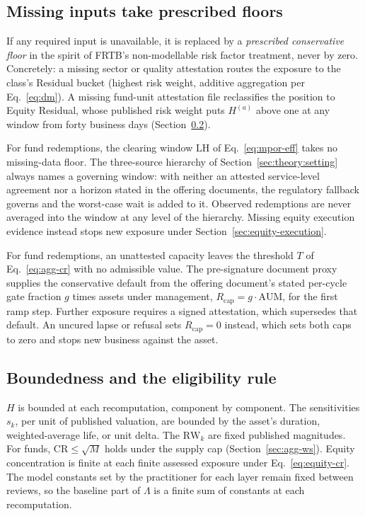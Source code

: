 \subsection{Missing inputs take prescribed floors}\label{sec:agg-missing}
If any required input is unavailable, it is replaced by a \emph{prescribed conservative
floor} in the spirit of FRTB's non-modellable risk factor treatment, never by zero.
Concretely: a missing sector or quality attestation routes the exposure to the
class's Residual bucket (highest risk weight, additive aggregation per
Eq.~\eqref{eq:dm}). A missing fund-unit attestation file reclassifies the position
to Equity Residual, whose published risk weight puts $H^{(a)}$ above one at any window from
forty business days (Section~\ref{sec:agg-bounded}).

For fund redemptions, the clearing window $\mathrm{LH}$ of Eq.~\eqref{eq:mpor-eff} takes no missing-data floor.
The three-source hierarchy of Section~\ref{sec:theory:setting} always names a governing
window: with neither an attested service-level agreement nor a horizon stated in the offering
documents, the regulatory fallback governs and the worst-case wait is added to it. Observed
redemptions are never averaged into the window at any level of the hierarchy. Missing equity execution evidence instead stops new exposure under Section~\ref{sec:equity-execution}.

For fund redemptions, an unattested capacity leaves the threshold $T$ of Eq.~\eqref{eq:agg-cr}
with no admissible value. The pre-signature document proxy supplies the conservative default from the offering
document's stated per-cycle gate fraction $g$ times assets under management,
$R_{\mathrm{cap}} = g\cdot\mathrm{AUM}$, for the first ramp step. Further exposure requires
a signed attestation, which supersedes that default. An uncured lapse or refusal sets
$R_{\mathrm{cap}}=0$ instead, which sets both caps to zero and stops new business against the
asset.

\subsection{Boundedness and the eligibility rule}\label{sec:agg-bounded}
$H$ is bounded at each recomputation, component by component. The sensitivities $s_k$, per
unit of published valuation, are bounded by the asset's duration, weighted-average life,
or unit delta. The $\mathrm{RW}_k$ are fixed published magnitudes.
For funds, $\mathrm{CR}\le\sqrt{M}$ holds under the supply cap (Section~\ref{sec:agg-ws}). Equity concentration is finite at each finite assessed exposure under Eq.~\eqref{eq:equity-cr}. The
model constants set by the practitioner for each layer remain fixed between reviews, so the baseline part of $\Lambda$ is a
finite sum of constants at each recomputation.

